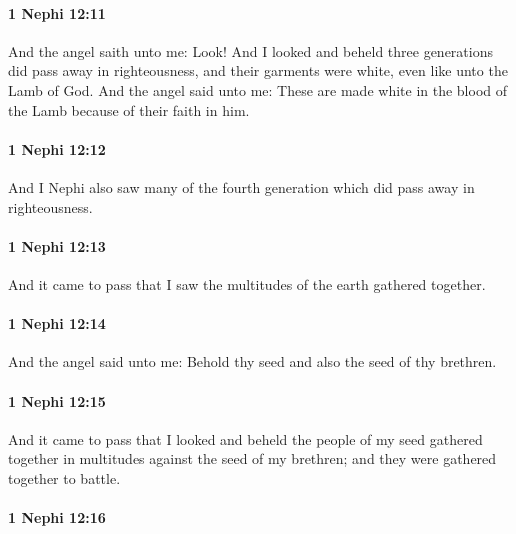 		\paragraph{1 Nephi 12:11} %
			\label{1NEPHI-12-11}

			And the angel saith unto me: Look!
			And I looked and beheld three generations did pass away in righteousness,
			and their garments were white, even like unto the Lamb of God.
			And the angel said unto me:
			These are made white in the blood of the Lamb
			because of their faith in him.

		\paragraph{1 Nephi 12:12} %
			\label{1NEPHI-12-12}

			And I Nephi also saw many of the fourth generation
			which did pass away in righteousness.

		\paragraph{1 Nephi 12:13} %
			\label{1NEPHI-12-13}

			And it came to pass that I saw the multitudes of the earth gathered together.

		\paragraph{1 Nephi 12:14} %
			\label{1NEPHI-12-14}

			And the angel said unto me:
			Behold thy seed and also the seed of thy brethren.

		\paragraph{1 Nephi 12:15} %
			\label{1NEPHI-12-15}

			And it came to pass that I looked and beheld the people of my seed
			gathered together in multitudes against the seed of my brethren;
			and they were gathered together to battle.

		\paragraph{1 Nephi 12:16} %
			\label{1NEPHI-12-16}

